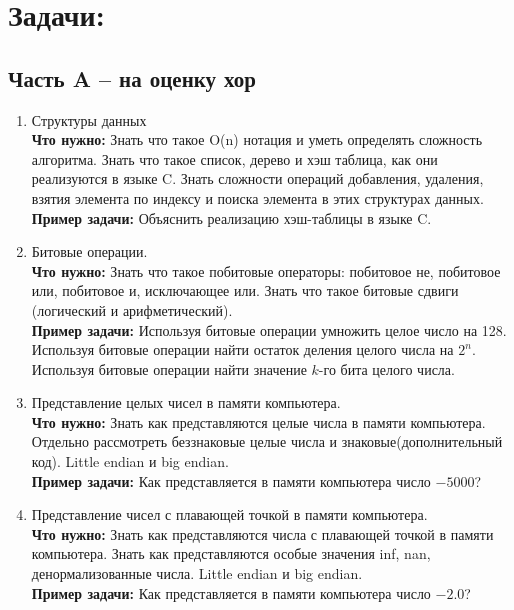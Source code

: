 \documentclass{article}
\begin{document}

\section*{Задачи:}
\subsection*{Часть A -- на оценку хор}

\begin{enumerate}

\item Структуры данных\\
\textbf{Что нужно:} Знать что такое O(n) нотация и уметь определять сложность алгоритма. Знать что такое список, дерево и хэш таблица, как они реализуются в языке C. Знать сложности операций добавления, удаления, взятия элемента по индексу и поиска элемента в этих структурах данных.\\
\textbf{Пример задачи:} Объяснить реализацию хэш-таблицы в языке C.

\item Битовые операции.\\
\textbf{Что нужно:} Знать что такое побитовые операторы: побитовое не, побитовое или, побитовое и, исключающее или. Знать что такое битовые сдвиги (логический и арифметический). \\
\textbf{Пример задачи:} Используя битовые операции умножить целое число на 128. Используя битовые операции найти остаток деления целого числа на $2^n$. Используя битовые операции найти значение $k$-го бита целого числа.

\item Представление целых чисел в памяти компьютера.\\
\textbf{Что нужно:} Знать как представляются целые числа в памяти компьютера. Отдельно рассмотреть беззнаковые целые числа и знаковые(дополнительный код). Little endian и big endian.\\
\textbf{Пример задачи:} Как представляется в памяти компьютера число $-5000$?

\item Представление чисел с плавающей точкой в памяти компьютера.\\
\textbf{Что нужно:} Знать как представляются числа с плавающей точкой в памяти компьютера. Знать как представляются особые значения inf, nan, денормализованные числа. Little endian и big endian.\\
\textbf{Пример задачи:} Как представляется в памяти компьютера число $-2.0$?


\end{enumerate}
\end{document}
